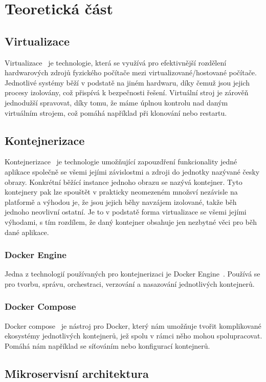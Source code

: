 ﻿\chapter{Teoretická část}
\section{Virtualizace}
Virtualizace~\autocite{virtualizace-Martin-Polednik} je technologie, která se využívá pro efektivnější rozdělení hardwarových zdrojů fyzického  počítače mezi virtualizované/hostované počítače.
Jednotlivé systémy běží v podstatě na jiném hardwaru, díky čemuž jsou jejich procesy izolovány, což přispívá k bezpečnosti řešení.
Virtuální stroj je zárověň jednodužší spravovat, díky tomu, že máme úplnou kontrolu nad daným virtuálním strojem, což pomáhá například při klonování nebo restartu.

\section{Kontejnerizace}
Kontejnerizace~\autocite{virtualizace-Martin-Polednik} je technologie umožňující zapouzdření funkcionality jedné aplikace společně se všemi jejími závislostmi a zdroji do jednotky nazývané česky obrazy.
Konkrétní běžící instance jednoho obrazu se nazývá kontejner.
Tyto kontejnery pak lze spouštět v prakticky neomezeném množsví nezávisle na platformě a výhodou je, že jsou jejich běhy navzájem izolované, takže běh jednoho neovlivní ostatní.
Je to v podstatě forma virtualizace se všemi jejími výhodami, s tím rozdílem, že daný kontejner obsahuje jen nezbytné věci pro běh dané aplikace.
\subsection{Docker Engine}
Jedna z technologií používaných pro kontejnerizaci je Docker Engine~\autocite{kontejnerizace-docker}.
Používá se pro tvorbu, správu, orchestraci, verzování a nasazování jednotlivých kontejnerů.
\subsection{Docker Compose}
Docker compose~\autocite{kontejnerizace-docker-compose} je nástroj pro Docker, který nám umožňuje tvořit komplikované ekosystémy jednotlivých kontejnerů, jež spolu v rámci něho mohou spolupracovat.
Pomáhá nám například se síťováním nebo konfigurací kontejnerů.
\section{Mikroservisní architektura}
